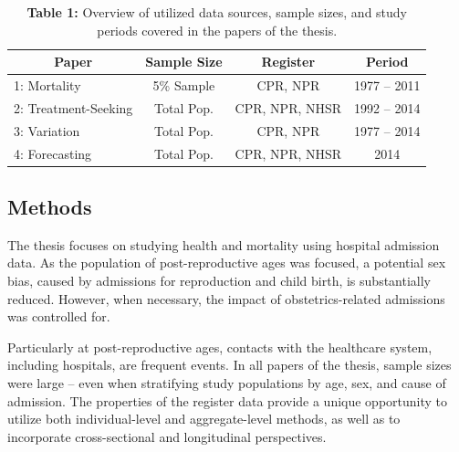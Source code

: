 	\begin{table}[htbp]
  		\centering
 		 \caption*{\textbf{Table 1:}   Overview of utilized data sources, sample sizes, and study periods 
  									   covered in the papers of the thesis.}
    	\begin{tabular}{lccc}
    	\toprule
    	\multicolumn{1}{c}{\textbf{Paper}} & \textbf{Sample Size} & \textbf{Register} & \textbf{Period} \\
    	\midrule
    	1: Mortality 			& 5\% Sample	 & CPR, NPR 		& 1977 -- 2011 \\
    	2: Treatment-Seeking	& Total Pop. 	 & CPR, NPR, NHSR 	& 1992 -- 2014 \\
    	3: Variation 			& Total Pop. 	 & CPR, NPR 		& 1977 -- 2014 \\
    	4: Forecasting		    & Total Pop. 	 & CPR, NPR, NHSR 	& 2014 \\
    	\bottomrule
    	\bottomrule
   		\end{tabular}%
   	\vspace{0.15in}
   	\label{ch1:tab1}
	\end{table}%




\subsection{Methods}

The thesis focuses on studying health and mortality using hospital 
admission data. As the population of post-reproductive ages was focused, 
a potential sex bias, caused by admissions for reproduction and 
child birth, is substantially reduced. However, when necessary, 
the impact of obstetrics-related admissions was controlled for.

Particularly at post-reproductive ages, contacts with the healthcare 
system, including hospitals, are frequent events. In all papers of 
the thesis, sample sizes were large -- even when stratifying study 
populations by age, sex, and cause of admission. The properties of 
the register data provide a unique opportunity to utilize both 
individual-level and aggregate-level methods, as well as to incorporate 
cross-sectional and longitudinal 
perspectives. 

